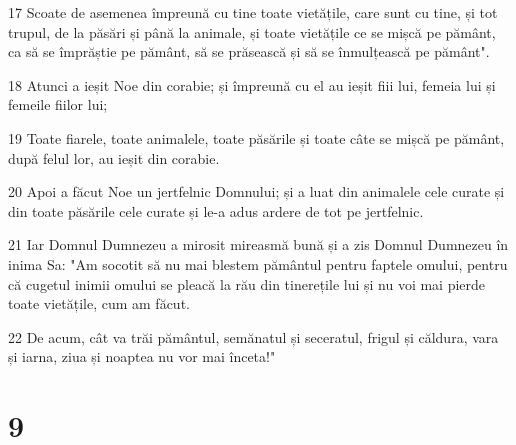 \par 17 Scoate de asemenea împreună cu tine toate vietățile, care sunt cu tine, și tot trupul, de la păsări și până la animale, și toate vietățile ce se mișcă pe pământ, ca să se împrăștie pe pământ, să se prăsească și să se înmulțească pe pământ".
\par 18 Atunci a ieșit Noe din corabie; și împreună cu el au ieșit fiii lui, femeia lui și femeile fiilor lui;
\par 19 Toate fiarele, toate animalele, toate păsările și toate câte se mișcă pe pământ, după felul lor, au ieșit din corabie.
\par 20 Apoi a făcut Noe un jertfelnic Domnului; și a luat din animalele cele curate și din toate păsările cele curate și le-a adus ardere de tot pe jertfelnic.
\par 21 Iar Domnul Dumnezeu a mirosit mireasmă bună și a zis Domnul Dumnezeu în inima Sa: "Am socotit să nu mai blestem pământul pentru faptele omului, pentru că cugetul inimii omului se pleacă la rău din tinerețile lui și nu voi mai pierde toate vietățile, cum am făcut.
\par 22 De acum, cât va trăi pământul, semănatul și seceratul, frigul și căldura, vara și iarna, ziua și noaptea nu vor mai înceta!"

\chapter{9}

